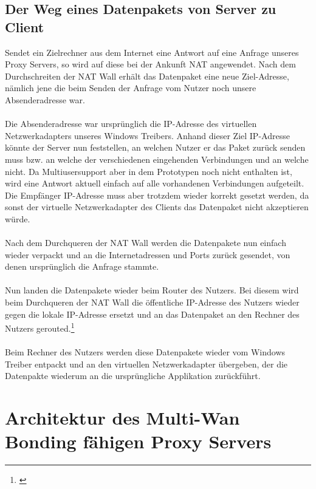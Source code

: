 \subsection{Der Weg eines Datenpakets von Server zu Client}
Sendet ein Zielrechner aus dem Internet eine Antwort auf eine Anfrage unseres Proxy Servers, so wird auf diese bei der Ankunft NAT angewendet. Nach dem Durchschreiten der NAT Wall erhält das Datenpaket eine neue Ziel-Adresse, nämlich jene die beim Senden der Anfrage vom Nutzer noch unsere Absenderadresse war.
\\\\
Die Absenderadresse war ursprünglich die IP-Adresse des virtuellen Netzwerkadapters unseres Windows Treibers. Anhand dieser Ziel IP-Adresse könnte der Server nun feststellen, an welchen Nutzer er das Paket zurück senden muss bzw. an welche der verschiedenen eingehenden Verbindungen und an welche nicht. Da Multiusersupport aber in dem Prototypen noch nicht enthalten ist, wird eine Antwort aktuell einfach auf alle vorhandenen Verbindungen aufgeteilt. Die Empfänger IP-Adresse muss aber trotzdem wieder korrekt gesetzt werden, da sonst der virtuelle Netzwerkadapter des Clients das Datenpaket nicht akzeptieren würde.
\\\\
Nach dem Durchqueren der NAT Wall werden die Datenpakete nun einfach wieder verpackt und an die Internetadressen und Ports zurück gesendet, von denen ursprünglich die Anfrage stammte.
\\\\
Nun landen die Datenpakete wieder beim Router des Nutzers. Bei diesem wird beim Durchqueren der NAT Wall die öffentliche IP-Adresse des Nutzers wieder gegen die lokale IP-Adresse ersetzt und an das Datenpaket an den Rechner des Nutzers gerouted.\footnote[1]{\cite[Vgl.][]{SRV5}}
\\\\ 
Beim Rechner des Nutzers werden diese Datenpakete wieder vom Windows Treiber entpackt und an den virtuellen Netzwerkadapter übergeben, der die Datenpakte wiederum an die ursprüngliche Applikation zurückführt.

\newpage
\section{Architektur des Multi-Wan Bonding fähigen Proxy Servers}
